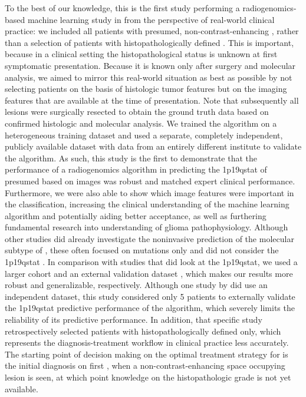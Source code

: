 To the best of our knowledge, this is the first study performing a radiogenomics-based machine learning study in  from the perspective of real-world clinical practice: we included all patients with presumed, non-contrast-enhancing , rather than a selection of patients with histopathologically defined .
This is important, because in a clinical setting the histopathological status is unknown at first symptomatic presentation.
Because it is known only after surgery and molecular analysis, we aimed to mirror this real-world situation as best as possible by not selecting patients on the basis of histologic \gls{tumor} features but on the imaging features that are available at the time of presentation.
Note that subsequently all lesions were surgically resected to obtain the ground truth data based on confirmed histologic and molecular analysis.
We trained the algorithm on a heterogeneous training dataset and used a separate, completely independent, publicly available dataset with data from an entirely different institute to validate the algorithm.
As such, this study is the first to demonstrate that the performance of a radiogenomics algorithm in predicting the \acl{1p19qstat} of presumed  based on  images was robust and matched expert clinical performance.
Furthermore, we were also able to show which image features were important in the classification, increasing the clinical understanding of the machine learning algorithm and potentially aiding better acceptance, as well as furthering fundamental research into understanding of glioma pathophysiology.
\newpage
Although other studies did already investigate the noninvasive prediction of the molecular subtype of , these often focused on  mutations only and did not consider the \acl{1p19qstat} \autocite{li2017deep, ren2019noninvasive, yu2017noninvasive}.
In comparison with studies that did look at the \acl{1p19qstat}, we used a larger cohort and an external validation dataset \autocite{akkus2017predicting, chang2018deep, han2018non, park2018prediction, shofty2018mri}, which makes our results more robust and generalizable, respectively.
Although one study by  did use an independent dataset, this study considered only 5 patients to externally validate the \acl{1p19qstat} predictive performance of the algorithm, which severely limits the reliability of its predictive performance.
In addition, that specific study retrospectively selected patients with histopathologically defined  only, which represents the diagnosis-treatment workflow in clinical practice less accurately.
The starting point of decision making on the optimal treatment strategy for  is the initial diagnosis on first , when a non-contrast-enhancing space occupying lesion is seen, at which point knowledge on the histopathologic grade is not yet available.

